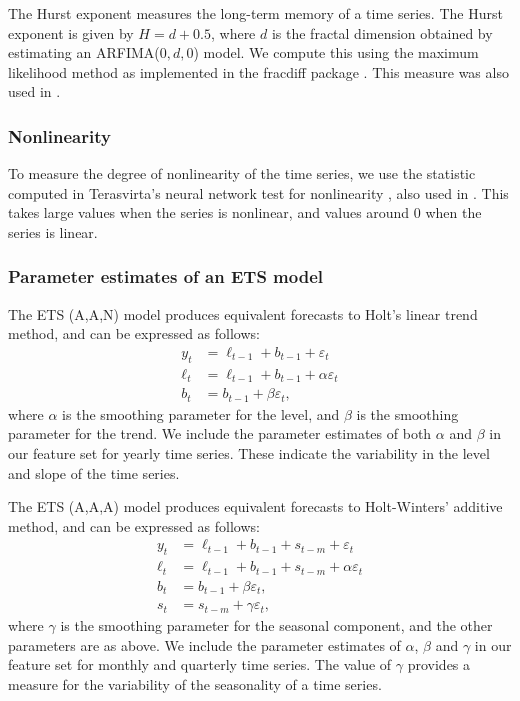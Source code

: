 \documentclass[11pt,a4paper,]{article}
\begin{document}
The Hurst exponent measures the long-term memory of a time series. The Hurst exponent is given by \(H=d+0.5\), where \(d\) is the fractal dimension obtained by estimating an ARFIMA(\(0, d, 0\)) model. We compute this using the maximum likelihood method \autocite{haslett1989space} as implemented in the fracdiff package \autocite{fracdiff}. This measure was also used in \textcite{wang2009rule}.

\hypertarget{nonlinearity}{%
\subsubsection*{Nonlinearity}\label{nonlinearity}}

To measure the degree of nonlinearity of the time series, we use the statistic computed in Terasvirta's neural network test for nonlinearity \autocite{nonlintest}, also used in \textcite{wang2009rule}. This takes large values when the series is nonlinear, and values around 0 when the series is linear.

\hypertarget{parameter-estimates-of-an-ets-model}{%
\subsubsection*{Parameter estimates of an ETS model}\label{parameter-estimates-of-an-ets-model}}

The ETS (A,A,N) model \autocite{expsmooth08} produces equivalent forecasts to Holt's linear trend method, and can be expressed as follows:
\begin{align*}
    y_t    & = \ell_{t-1}+b_{t-1}+\varepsilon_t        \\
    \ell_t & = \ell_{t-1}+b_{t-1}+\alpha \varepsilon_t \\
    b_t    & = b_{t-1}+\beta \varepsilon_t,
\end{align*}
where \(\alpha\) is the smoothing parameter for the level, and \(\beta\) is the smoothing parameter for the trend. We include the parameter estimates of both \(\alpha\) and \(\beta\) in our feature set for yearly time series. These indicate the variability in the level and slope of the time series.

The ETS (A,A,A) model \autocite{expsmooth08} produces equivalent forecasts to Holt-Winters' additive method, and can be expressed as follows:
\begin{align*}
    y_t    & = \ell_{t-1}+b_{t-1}+s_{t-m}+\varepsilon_t        \\
    \ell_t & = \ell_{t-1}+b_{t-1}+s_{t-m}+\alpha \varepsilon_t \\
    b_t    & = b_{t-1}+\beta \varepsilon_t,                    \\
    s_t    & = s_{t-m} + \gamma\varepsilon_t,
\end{align*}
where \(\gamma\) is the smoothing parameter for the seasonal component, and the other parameters are as above. We include the parameter estimates of \(\alpha\), \(\beta\) and \(\gamma\) in our feature set for monthly and quarterly time series. The value of \(\gamma\) provides a measure for the variability of the seasonality of a time series.
\end{document}

